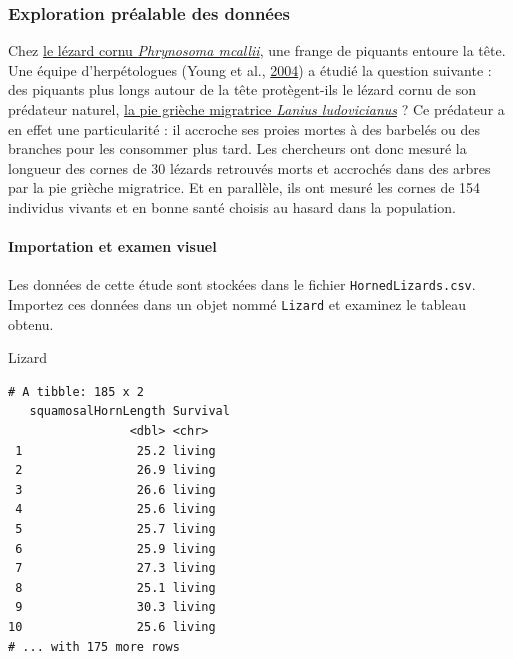 \documentclass[a4paperpaper,]{article}
\newenvironment{Shaded}{\begin{snugshade}}{\end{snugshade}}
\newcommand{\NormalTok}[1]{\textcolor[rgb]{0.12,0.11,0.11}{#1}}
\let\oldparagraph\paragraph
\renewcommand{\paragraph}[1]{\oldparagraph{#1}\mbox{}}
\begin{document}
\hypertarget{exploration-prealable-des-donnees}{%
\subsubsection{Exploration préalable des données}\label{exploration-prealable-des-donnees}}

Chez \href{https://fr.wikipedia.org/wiki/Phrynosoma_mcallii}{le lézard cornu \emph{Phrynosoma mcallii}}, une frange de piquants entoure la tête. Une équipe d'herpétologues (Young et al., \protect\hyperlink{ref-Young2004}{2004}) a étudié la question suivante : des piquants plus longs autour de la tête protègent-ils le lézard cornu de son prédateur naturel, \href{https://fr.wikipedia.org/wiki/Pie-grièche_migratrice}{la pie grièche migratrice \emph{Lanius ludovicianus}} ? Ce prédateur a en effet une particularité : il accroche ses proies mortes à des barbelés ou des branches pour les consommer plus tard. Les chercheurs ont donc mesuré la longueur des cornes de 30 lézards retrouvés morts et accrochés dans des arbres par la pie grièche migratrice. Et en parallèle, ils ont mesuré les cornes de 154 individus vivants et en bonne santé choisis au hasard dans la population.

\hypertarget{importation-et-examen-visuel-2}{%
\paragraph{Importation et examen visuel}\label{importation-et-examen-visuel-2}}

Les données de cette étude sont stockées dans le fichier \texttt{HornedLizards.csv}. Importez ces données dans un objet nommé \texttt{Lizard} et examinez le tableau obtenu.

\begin{Shaded}
\begin{Highlighting}[]
\NormalTok{Lizard}
\end{Highlighting}
\end{Shaded}

\begin{verbatim}
# A tibble: 185 x 2
   squamosalHornLength Survival
                 <dbl> <chr>   
 1                25.2 living  
 2                26.9 living  
 3                26.6 living  
 4                25.6 living  
 5                25.7 living  
 6                25.9 living  
 7                27.3 living  
 8                25.1 living  
 9                30.3 living  
10                25.6 living  
# ... with 175 more rows
\end{verbatim}
\end{document}
